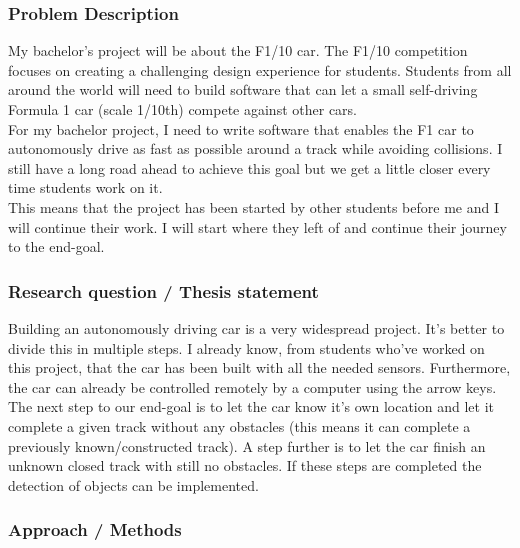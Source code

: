 \documentclass[a4paper,notitlepage]{article}
\begin{document}
\subsubsection*{Problem Description}

My bachelor's project will be about the F1/10 car\cite{F1}. The F1/10 competition focuses on creating a challenging design experience for students. Students from all around the world will need to build software that can let a small self-driving Formula 1 car (scale 1/10th) compete against other cars.\\

For my bachelor project, I need to write software that enables the F1 car to autonomously drive as fast as possible around a track while avoiding collisions. I still have a long road ahead to achieve this goal but we get a little closer every time students work on it. \\

This means that the project has been started by other students before me and I will continue their work. I will start where they left of and continue their journey to the end-goal.

\subsubsection*{Research question / Thesis statement}

Building an autonomously driving car is a very widespread project. It's better to divide this in multiple steps. I already know, from students who've worked on this project, that the car has been built with all the needed sensors. Furthermore, the car can already be controlled remotely by a computer using the arrow keys.\\

The next step to our end-goal is to let the car know it's own location and let it complete a given track without any obstacles (this means it can complete a previously known/constructed track). A step further is to let the car finish an unknown closed track with still no obstacles. If these steps are completed the detection of objects can be implemented.  

\subsubsection*{Approach / Methods}
\end{document}
